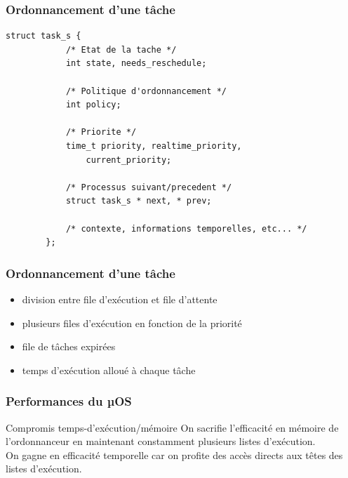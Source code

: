 \documentclass{beamer}
\begin{document}
\begin{frame}[fragile]
    \frametitle{Ordonnancement d'une tâche}
    \begin{lstlisting}[caption=Représentation structurelle d'un processus]
        struct task_s {
            /* Etat de la tache */
            int state, needs_reschedule;

            /* Politique d'ordonnancement */
            int policy;

            /* Priorite */
            time_t priority, realtime_priority,
                current_priority;

            /* Processus suivant/precedent */
            struct task_s * next, * prev;

            /* contexte, informations temporelles, etc... */
        };
    \end{lstlisting}
\end{frame}

\begin{frame}
    \frametitle{Ordonnancement d'une tâche}

    \begin{itemize}
        \item<2-> division entre file d'exécution et file d'attente
        \item<3-> plusieurs files d'exécution en fonction de la priorité
        \item<4-> file de tâches expirées
        \item<5-> temps d'exécution alloué à chaque tâche
    \end{itemize}

\end{frame}

\begin{frame}
    \frametitle{Performances du µOS}

    \begin{block}{Compromis temps-d'exécution/mémoire}
        On sacrifie l'efficacité en mémoire de l'ordonnanceur en maintenant
        constamment plusieurs listes d'exécution. \\
        On gagne en efficacité temporelle car on profite des accès directs aux
        têtes des listes d'exécution.
    \end{block}

\end{frame}
\end{document}
